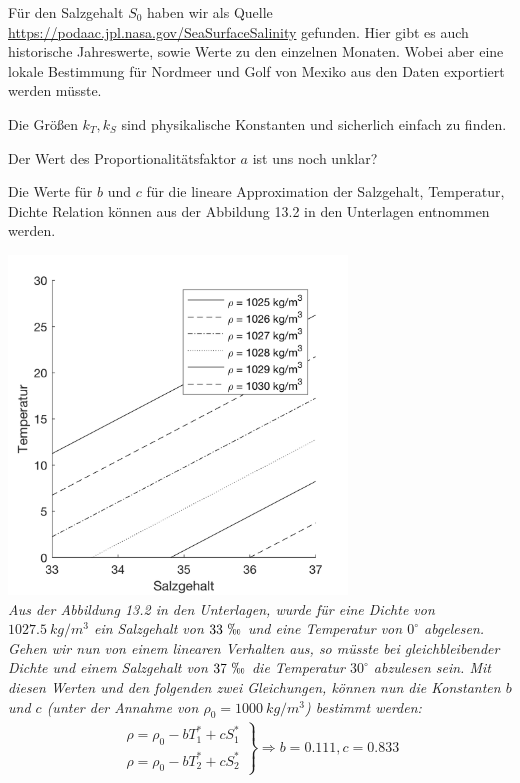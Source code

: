 \documentclass[10pt,a4paper]{article}
\begin{document}
	Für den Salzgehalt \(S_0\) haben wir als Quelle \url{https://podaac.jpl.nasa.gov/SeaSurfaceSalinity} gefunden. Hier gibt es auch historische Jahreswerte, sowie Werte zu den einzelnen Monaten. Wobei aber eine lokale Bestimmung für Nordmeer und Golf von Mexiko aus den Daten exportiert werden müsste.
	
	Die Größen \(k_T, k_S\) sind physikalische Konstanten und sicherlich einfach zu finden.
	
	Der Wert des Proportionalitätsfaktor \(a\) ist uns noch unklar?
	
	Die Werte für \(b\) und \(c\) für die lineare Approximation der Salzgehalt, Temperatur, Dichte Relation können aus der Abbildung 13.2 in den Unterlagen entnommen werden.
	
	\begin{center}
	\includegraphics[width=9cm]{Diagramme/salz_temp_dichte.png} \\
	\textit{Aus der Abbildung 13.2 in den Unterlagen, wurde für eine Dichte von \(1027.5~kg/m^3\) ein Salzgehalt von \(33~\permil\) und eine Temperatur von \(0^\circ\) abgelesen. Gehen wir nun von einem linearen Verhalten aus, so müsste bei gleichbleibender Dichte und einem Salzgehalt von \(37~\permil\) die Temperatur \(30^\circ\) abzulesen sein. Mit diesen Werten und den folgenden zwei Gleichungen, können nun die Konstanten \(b\) und \(c\) (unter der Annahme von \(\rho_0 = 1000~kg/m^3\)) bestimmt werden:}
	\begin{align*}
		\left. \begin{array}{ll}
			\rho = \rho_0 - b T^*_1 + c S^*_1 \\
			\rho = \rho_0 - b T^*_2 + c S^*_2
		\end{array} \right\}
		\Rightarrow b = 0.111, c = 0.833
	\end{align*}
	\end{center}	
	
\end{document}
